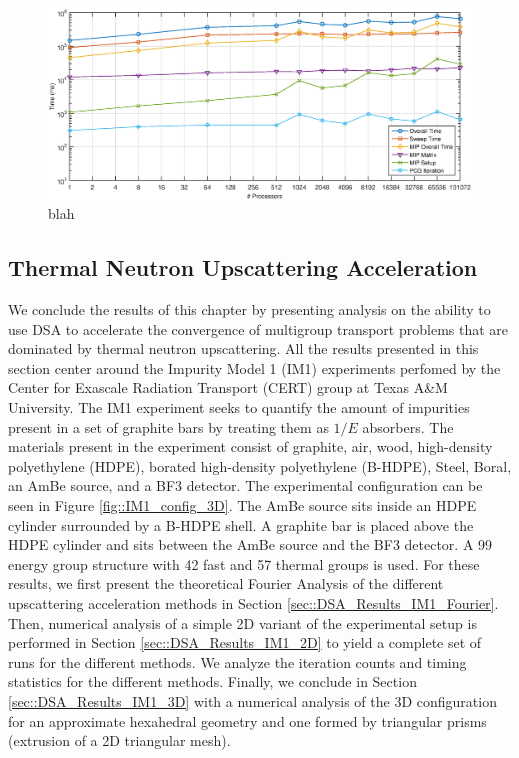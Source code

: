\begin{figure}
\centering
\includegraphics[width=\textwidth]{figures/sec_DSA/Vulcan_DSA_Timing.eps}
\caption{blah}
\label{fig::DSA_Vulcan_MIP_Timing}
\end{figure}
\fi

\subsection{Thermal Neutron Upscattering Acceleration}
\label{sec::DSA_Results_IM1}

We conclude the results of this chapter by presenting analysis on the ability to use DSA to accelerate the convergence of multigroup transport problems that are dominated by thermal neutron upscattering. All the results presented in this section center around the Impurity Model 1 (IM1) experiments perfomed by the Center for Exascale Radiation Transport (CERT) group at Texas A\&M University. The IM1 experiment seeks to quantify the amount of impurities present in a set of graphite bars by treating them as $1/E$ absorbers. The materials present in the experiment consist of graphite, air, wood, high-density polyethylene (HDPE), borated high-density polyethylene (B-HDPE), Steel, Boral, an AmBe source, and a BF3 detector. The experimental configuration can be seen in Figure \ref{fig::IM1_config_3D}. The AmBe source sits inside an HDPE cylinder surrounded by a B-HDPE shell. A graphite bar is placed above the HDPE cylinder and sits between the AmBe source and the BF3 detector. A 99 energy group structure with 42 fast and 57 thermal groups is used. For these results, we first present the theoretical Fourier Analysis of the different upscattering acceleration methods in Section \ref{sec::DSA_Results_IM1_Fourier}. Then, numerical analysis of a simple 2D variant of the experimental setup is performed in Section \ref{sec::DSA_Results_IM1_2D} to yield a complete set of runs for the different methods. We analyze the iteration counts and timing statistics for the different methods. Finally, we conclude in Section \ref{sec::DSA_Results_IM1_3D} with a numerical analysis of the 3D configuration for an approximate hexahedral geometry and one formed by triangular prisms (extrusion of a 2D triangular mesh).

